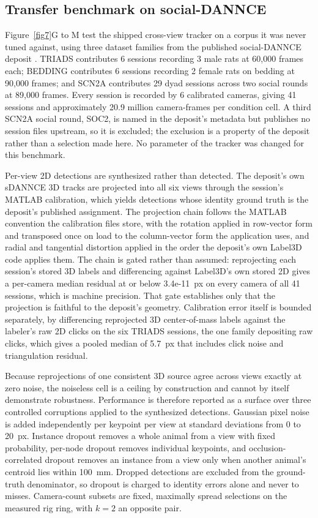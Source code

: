 \documentclass[pdflatex, sn-nature]{sn-jnl}
\theoremstyle{thmstyleone}%
\theoremstyle{thmstyletwo}%
\theoremstyle{thmstylethree}%
\begin{document}
\subsection{Transfer benchmark on social-DANNCE}\label{methods-transfer}

Figure~\ref{fig7}G to M test the shipped cross-view tracker on a corpus it was never tuned against, using three dataset families from the published social-DANNCE deposit \citep{Klibaite2025}. TRIADS contributes 6 sessions recording 3 male rats at 60,000 frames each; BEDDING contributes 6 sessions recording 2 female rats on bedding at 90,000 frames; and SCN2A contributes 29 dyad sessions across two social rounds at 89,000 frames. Every session is recorded by 6 calibrated cameras, giving 41 sessions and approximately 20.9 million camera-frames per condition cell. A third SCN2A social round, SOC2, is named in the deposit's metadata but publishes no session files upstream, so it is excluded; the exclusion is a property of the deposit rather than a selection made here. No parameter of the tracker was changed for this benchmark.

Per-view 2D detections are synthesized rather than detected. The deposit's own sDANNCE 3D tracks are projected into all six views through the session's MATLAB calibration, which yields detections whose identity ground truth is the deposit's published assignment. The projection chain follows the MATLAB convention the calibration files store, with the rotation applied in row-vector form and transposed once on load to the column-vector form the application uses, and radial and tangential distortion applied in the order the deposit's own Label3D code applies them. The chain is gated rather than assumed: reprojecting each session's stored 3D labels and differencing against Label3D's own stored 2D gives a per-camera median residual at or below 3.4e-11~px on every camera of all 41 sessions, which is machine precision. That gate establishes only that the projection is faithful to the deposit's geometry. Calibration error itself is bounded separately, by differencing reprojected 3D center-of-mass labels against the labeler's raw 2D clicks on the six TRIADS sessions, the one family depositing raw clicks, which gives a pooled median of 5.7~px that includes click noise and triangulation residual.

Because reprojections of one consistent 3D source agree across views exactly at zero noise, the noiseless cell is a ceiling by construction and cannot by itself demonstrate robustness. Performance is therefore reported as a surface over three controlled corruptions applied to the synthesized detections. Gaussian pixel noise is added independently per keypoint per view at standard deviations from 0 to 20~px. Instance dropout removes a whole animal from a view with fixed probability, per-node dropout removes individual keypoints, and occlusion-correlated dropout removes an instance from a view only when another animal's centroid lies within 100~mm. Dropped detections are excluded from the ground-truth denominator, so dropout is charged to identity errors alone and never to misses. Camera-count subsets are fixed, maximally spread selections on the measured rig ring, with $k = 2$ an opposite pair.
\end{document}
